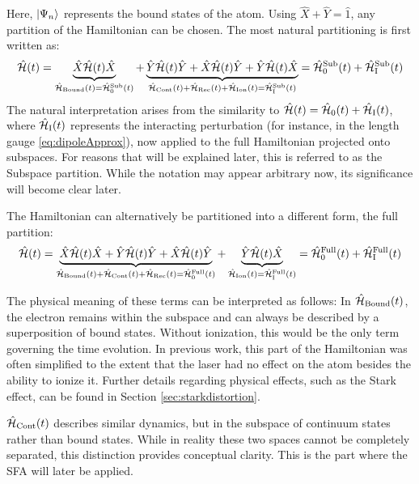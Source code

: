 Here, $\ket{\Psi_n}$ represents the bound states of the atom. Using $\hat{X}+\hat{Y}=\hat{1}$, any partition of the Hamiltonian can be chosen.
The most natural partitioning is first written as:
\begin{equation*}
    \hat{\mathcal{H}}(t) = \underbrace{\hat{X}\hat{\mathcal{H}}(t)\hat{X}}_{\hat{\mathcal{H}}_{\mathrm{Bound}}(t)=\hat{\mathcal{H}}^{\mathrm{Sub}}_0(t)} + \underbrace{\hat{Y}\hat{\mathcal{H}}(t)\hat{Y} + \hat{X}\hat{\mathcal{H}}(t)\hat{Y} + \hat{Y}\hat{\mathcal{H}}(t)\hat{X}}_{\hat{\mathcal{H}}_{\mathrm{Cont}}(t)+\hat{\mathcal{H}}_{\mathrm{Rec}}(t)+\hat{\mathcal{H}}_{\mathrm{Ion}}(t)=\hat{\mathcal{H}}^{\mathrm{Sub}}_{\mathrm{I}}(t)} = \hat{\mathcal{H}}^{\mathrm{Sub}}_0(t)+\hat{\mathcal{H}}^{\mathrm{Sub}}_{\mathrm{I}}(t)
\end{equation*}
The natural interpretation arises from the similarity to $\hat{\mathcal{H}}(t)=\hat{\mathcal{H}}_0(t)+\hat{\mathcal{H}}_{\mathrm{I}}(t)$, where $\hat{\mathcal{H}}_{\mathrm{I}}(t)$ represents the interacting perturbation (for instance, in the length gauge \eqref{eq:dipoleApprox}), now applied to the full Hamiltonian projected onto subspaces.
For reasons that will be explained later, this is referred to as the Subspace partition.
While the notation may appear arbitrary now, its significance will become clear later.

The Hamiltonian can alternatively be partitioned into a different form, the full partition:
\begin{equation*}
    \hat{\mathcal{H}}(t) = \underbrace{\hat{X}\hat{\mathcal{H}}(t)\hat{X} + \hat{Y}\hat{\mathcal{H}}(t)\hat{Y} + \hat{X}\hat{\mathcal{H}}(t)\hat{Y}}_{\hat{\mathcal{H}}_{\mathrm{Bound}}(t)+\hat{\mathcal{H}}_{\mathrm{Cont}}(t)+\hat{\mathcal{H}}_{\mathrm{Rec}}(t)=\hat{\mathcal{H}}^{\mathrm{Full}}_0(t)} + \underbrace{\hat{Y}\hat{\mathcal{H}}(t)\hat{X}}_{\hat{\mathcal{H}}_{\mathrm{Ion}}(t) = \hat{\mathcal{H}}^{\mathrm{Full}}_{\mathrm{I}}(t)} = \hat{\mathcal{H}}^{\mathrm{Full}}_0(t)+\hat{\mathcal{H}}^{\mathrm{Full}}_{\mathrm{I}}(t)
\end{equation*}

The physical meaning of these terms can be interpreted as follows:
In $\hat{\mathcal{H}}_{\mathrm{Bound}}(t)$, the electron remains within the subspace and can always be described by a superposition of bound states.
Without ionization, this would be the only term governing the time evolution.
In previous work, this part of the Hamiltonian was often simplified to the extent that the laser had no effect on the atom besides the ability to ionize it. Further details regarding physical effects, such as the Stark effect, can be found in Section \ref{sec:starkdistortion}.

$\hat{\mathcal{H}}_{\mathrm{Cont}}(t)$ describes similar dynamics, but in the subspace of continuum states rather than bound states.
While in reality these two spaces cannot be completely separated, this distinction provides conceptual clarity.
This is the part where the SFA will later be applied.

